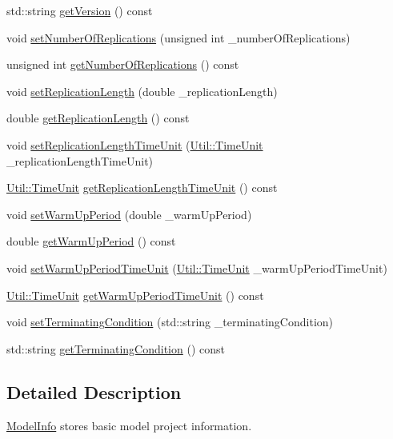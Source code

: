 \begin{DoxyCompactItemize}
std\-::string \hyperlink{class_model_info_a3edf40723a25ac5e48f687f61edfd831}{get\-Version} () const 
\item 
void \hyperlink{class_model_info_a72330fba06aa1ccff933b52ead028154}{set\-Number\-Of\-Replications} (unsigned int \-\_\-number\-Of\-Replications)
\item 
unsigned int \hyperlink{class_model_info_a66d8ae9376d62d74ea770d9e88e1bd89}{get\-Number\-Of\-Replications} () const 
\item 
void \hyperlink{class_model_info_a1566fe70905b1fe7fe1e092f139917bd}{set\-Replication\-Length} (double \-\_\-replication\-Length)
\item 
double \hyperlink{class_model_info_ab3d0f7e09c769b410618f99404b1eb4c}{get\-Replication\-Length} () const 
\item 
void \hyperlink{class_model_info_a9e0e1dd5f3fcee6d16c249451d0910ab}{set\-Replication\-Length\-Time\-Unit} (\hyperlink{class_util_a28504cc2fecc9aa47154cba4e625ec6f}{Util\-::\-Time\-Unit} \-\_\-replication\-Length\-Time\-Unit)
\item 
\hyperlink{class_util_a28504cc2fecc9aa47154cba4e625ec6f}{Util\-::\-Time\-Unit} \hyperlink{class_model_info_a4a6537a0fde41408839c7070f3d8f2b5}{get\-Replication\-Length\-Time\-Unit} () const 
\item 
void \hyperlink{class_model_info_ae3d5ebac01faed3db5e5e7fb54acc994}{set\-Warm\-Up\-Period} (double \-\_\-warm\-Up\-Period)
\item 
double \hyperlink{class_model_info_acdbb7b038db5c12d7b5e8e19674a778e}{get\-Warm\-Up\-Period} () const 
\item 
void \hyperlink{class_model_info_a24c120cce9ea134d6c9d1a2558866b30}{set\-Warm\-Up\-Period\-Time\-Unit} (\hyperlink{class_util_a28504cc2fecc9aa47154cba4e625ec6f}{Util\-::\-Time\-Unit} \-\_\-warm\-Up\-Period\-Time\-Unit)
\item 
\hyperlink{class_util_a28504cc2fecc9aa47154cba4e625ec6f}{Util\-::\-Time\-Unit} \hyperlink{class_model_info_adec436c79560bbfa5ec4e2bc21ae0450}{get\-Warm\-Up\-Period\-Time\-Unit} () const 
\item 
void \hyperlink{class_model_info_a4cb06dd9c3aeb8856ad50122714aa167}{set\-Terminating\-Condition} (std\-::string \-\_\-terminating\-Condition)
\item 
std\-::string \hyperlink{class_model_info_a31137229cc0de318e238bc9f18f021e2}{get\-Terminating\-Condition} () const 
\end{DoxyCompactItemize}


\subsection{Detailed Description}
\hyperlink{class_model_info}{Model\-Info} stores basic model project information. 

